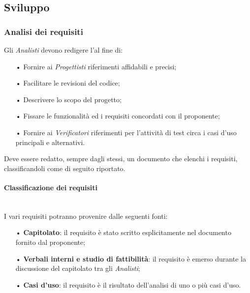 \subsection{Sviluppo}
\subsubsection{Analisi dei requisiti}
Gli \textit{Analisti} devono redigere l'\AdR al fine di:
\begin{itemize}
    \item[•] Fornire ai \textit{Progettisti} riferimenti affidabili e precisi;
    \item[•] Facilitare le revisioni del codice;
    \item[•] Descrivere lo scopo del progetto;
    \item[•] Fissare le funzionalità ed i {requisiti} concordati con il proponente;
    \item[•] Fornire ai \textit{Verificatori} riferimenti per l'attività di test circa i casi d'uso principali e alternativi.
\end{itemize}

Deve essere redatto, sempre dagli stessi, un documento che elenchi i requisiti, classificandoli come di seguito riportato.

\paragraph{Classificazione dei requisiti}\mbox{}\\
I vari requisiti potranno provenire dalle seguenti fonti:
\begin{itemize}
    \item[•] \textbf{Capitolato}: il requisito è stato scritto esplicitamente nel documento fornito dal proponente;
    \item[•] \textbf{Verbali interni e studio di fattibilità}: il requisito è emerso durante la discussione del capitolato tra gli \textit{Analisti};
    \item[•] \textbf{Casi d'uso}: il requisito è il risultato dell'analisi di uno o più casi d'uso.
\end{itemize}

